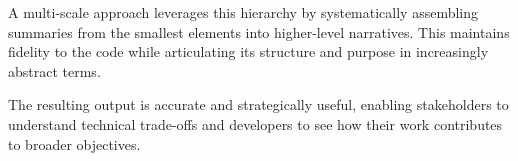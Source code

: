 \documentclass[12pt,twocolumn]{article}
\begin{document}
A multi-scale approach leverages this hierarchy by systematically assembling summaries 
from the smallest elements into higher-level narratives. This maintains fidelity to the 
code while articulating its structure and purpose in increasingly abstract terms.

The resulting output is accurate and strategically useful, enabling stakeholders to
understand technical trade-offs and developers to see how their work contributes to broader objectives.



\printbibliography%
\end{document}

